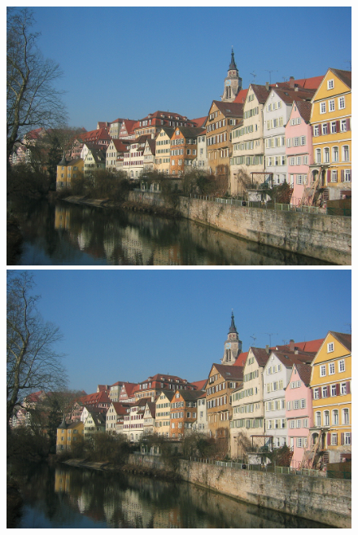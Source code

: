 \documentclass{article}
\begin{document}
\begin{figure}[htp]
    \begin{minipage}{0.3\linewidth}
    \includegraphics[width=\textwidth]{img/content/block1_conv1}
    \end{minipage}
    \begin{minipage}{0.3\linewidth}
    \includegraphics[width=\textwidth]{img/content/block2_conv1}
    \end{minipage}
    \begin{minipage}{0.3\linewidth}

\end{minipage}
\end{figure}
\end{document}
